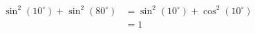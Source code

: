 \begin{equation}
\begin{split}
    \sin^2(10^\circ) + \sin^2(80^\circ)
        &= \sin^2(10^\circ) + \cos^2(10^\circ) \\
        &= 1
\end{split}
\end{equation}